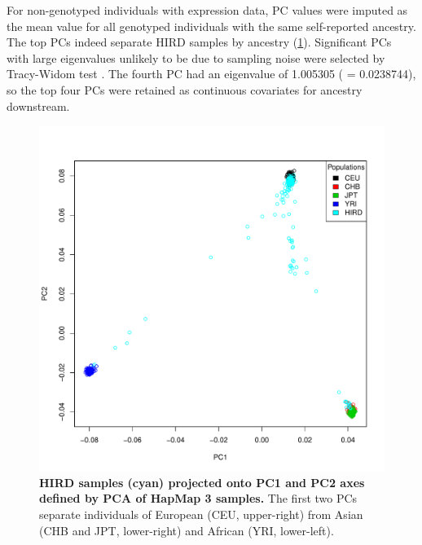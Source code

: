 For non-genotyped individuals with expression data, 
\gls{PC} values were imputed as the mean value for all genotyped individuals with the same self-reported ancestry.
The top \glspl{PC} indeed separate \gls{HIRD} samples by ancestry (\cref{fig:hird_genotype_pca_withHapmap}).
Significant \glspl{PC} with large eigenvalues unlikely to be due to sampling noise were selected by Tracy-Widom test \autocite{patterson2006PopulationStructureEigenanalysis}.
The fourth \gls{PC} had an eigenvalue of \num{1.005305} (\pvalue{} = \num{0.0238744}), 
so the top four \glspl{PC} were retained as continuous covariates for ancestry downstream.

\begin{figure}
    \includegraphics[width=1.0\textwidth]{mainmatter/figures/chapter_02/coreex_eQTLflu_20171204.gencall.smajor.impute_sex.qc3.pruned.hapmap_merged.flipped.pca.evec.pdf}
    \caption{
        \textbf{\gls{HIRD} samples (cyan) projected onto \gls{PC}1 and \gls{PC}2 axes defined by \gls{PCA} of HapMap 3 samples.}
        The first two \glspl{PC} separate individuals of European (CEU, upper-right) from Asian (CHB and JPT, lower-right) and African (YRI, lower-left).
    }
    \label{fig:hird_genotype_pca_withHapmap}
\end{figure}

